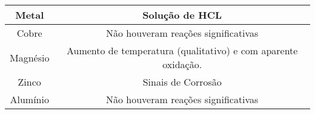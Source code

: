 \begin{center}
 \begin{tabular}{|c|c|}
  \hline
  \textbf{Metal} & \textbf{Solução de HCL} \\
  \hline
  Cobre & Não houveram reações significativas \\
  \hline
  Magnésio & Aumento de temperatura (qualitativo) e com aparente oxidação. \\
  \hline
  Zinco & Sinais de Corrosão \\
  \hline
  Alumínio &  Não houveram reações significativas  \\
  \hline
 \end{tabular}
\end{center}
